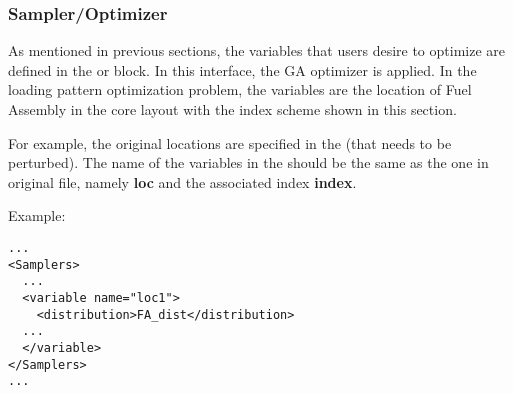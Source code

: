 \subsubsection{Sampler/Optimizer}
As mentioned in previous sections, the variables that users desire to optimize are defined in 
the  or   block. In this interface, the GA optimizer is applied.
In the loading pattern optimization problem, the variables are the location of Fuel Assembly in the core layout
with the index scheme shown in this section.

For example, the original locations are specified in the  (that needs to be perturbed).
The name of the variables in the  should be the same as the one in original 
file, namely \textbf{loc} and the associated index \textbf{index}.

Example:
\begin{lstlisting}[style=XML]
...
<Samplers>
  ...
  <variable name="loc1">
    <distribution>FA_dist</distribution>
  ...
  </variable>
</Samplers>
...
\end{lstlisting}


